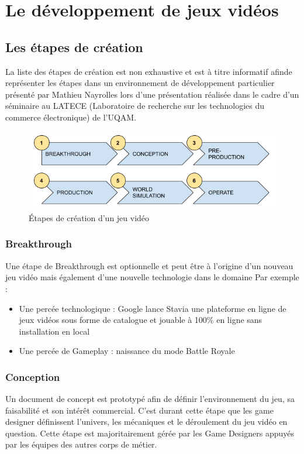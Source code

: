 \chapter{Le développement de jeux vidéos}
 
 
\section{Les étapes de création}
La liste des étapes de création est non exhaustive et est à titre informatif afinde représenter les étapes dans un environnement de développement particulier présenté par Mathieu Nayrolles lors d'une présentation réalisée dans le cadre d'un séminaire au LATECE (Laboratoire de recherche sur les technologies du commerce électronique) de l'UQAM.
\begin{figure}[H]
    \includegraphics[width=15cm]{10_img/production_stages.png} 
    \caption{Étapes de création d'un jeu vidéo}
\end{figure}
\subsection{Breakthrough}
Une étape de Breakthrough est optionnelle et peut être à l'origine d'un nouveau jeu vidéo mais également d'une nouvelle technologie dans le domaine
Par exemple :
\begin{itemize}
    \item Une percée technologique : Google lance Stavia une plateforme en ligne de jeux vidéos sous forme de catalogue et jouable à 100\% en ligne sans installation en local
    \item Une percée de Gameplay : naissance du mode Battle Royale
\end{itemize}

\subsection{Conception}
Un document de concept est prototypé afin de définir l'environnement du jeu, sa faisabilité et son intérêt commercial. C'est durant cette étape que les game designer définissent l'univers, les mécaniques et le déroulement du jeu vidéo en question. Cette étape est majoritairement gérée par les Game Designers appuyés par les équipes des autres corps de métier.

